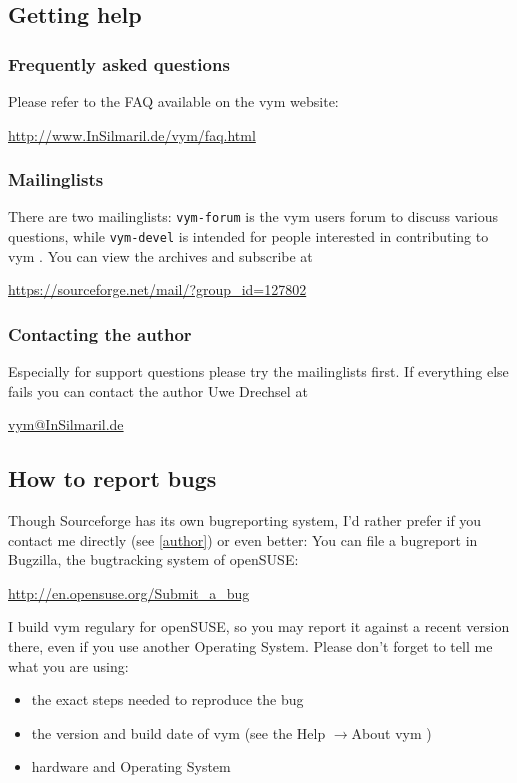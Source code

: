 \documentclass[12pt,a4paper]{article}
\newcommand{\vym}{{\sc vym }}
\newcommand{\ra}{$\longrightarrow$}
\begin{document}
\begin{appendix}
\subsection{Getting help}

\subsubsection*{Frequently asked questions}
Please refer to the FAQ available on the \vym website:
\begin{center}
\href{http://www.InSilmaril.de/vym/faq.html}{http://www.InSilmaril.de/vym/faq.html}
\end{center}

\subsubsection*{Mailinglists}
There are two mailinglists: {\tt vym-forum} is the \vym users forum to
discuss various questions, while {\tt vym-devel} is intended for people
interested in contributing to \vym. You can view the archives and
subscribe at
\begin{center}
\href{https://sourceforge.net/mail/?group_id=127802}{https://sourceforge.net/mail/?group\_id=127802}
\end{center}

\subsubsection*{Contacting the author}\label{author}
Especially for support questions please try the mailinglists first. If
everything else fails you can contact the author Uwe Drechsel at
\begin{center}
\href{mailto:vym@InSilmaril.de}{vym@InSilmaril.de}
\end{center}



\subsection{How to report bugs}
Though Sourceforge has its own bugreporting system, I'd rather prefer if
you contact me directly (see \ref{author}) or even better: You can file
a bugreport in Bugzilla, the bugtracking system of openSUSE:
\begin{center}
\href{http://en.opensuse.org/Submit_a_bug}{http://en.opensuse.org/Submit\_a\_bug}
\end{center}
I build \vym regulary for openSUSE, so you may report it against a
recent version there, even if you  use another Operating System.
Please don't forget to tell me what you are using:
\begin{itemize}
    \item the exact steps needed to reproduce the bug
    \item the version and build date of \vym (see the Help \ra About
    \vym)
    \item hardware and Operating System
\end{itemize}


\end{appendix}
\end{document}
